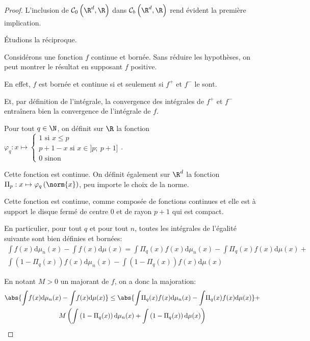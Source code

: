 \begin{proof}
L'inclusion de  $\mathcal{C}_0\left(\R^d,\R\right)$ dans $\mathcal{C}_b\left(\R^d,\R\right)$ rend évident la première implication.

Étudions la réciproque.

Considérons une fonction $f$ continue et bornée. Sans réduire les hypothèses, on peut montrer le résultat en supposant $f$ positive. 

En effet, $f$ est bornée et continue si et seulement si $f^{+}$ et $f^{-}$ le sont.

Et, par définition de l'intégrale, la convergence des intégrales de $f^{+}$ et $f^{-}$ entraînera bien la convergence de l'intégrale de $f$.

Pour tout $q \in \N$, on définit sur $\R$ la fonction $\varphi_q: x \mapsto \begin{cases} 1 \text{ si $x \leq p$}\\ p+1-x \text{ si $x \in ]p;~p+1]$}\\0 \text{ sinon} \end{cases}$.

Cette fonction est continue. On définit également sur $\R^d$ la fonction $\Pi_p: x \mapsto \varphi_q\left(\norm{x}\right)$, peu importe le choix de la norme.

Cette fonction est continue, comme composée de fonctions continues et elle est à support le disque fermé de centre $0$ et de rayon $p+1$ qui est compact. 

En particulier, pour tout $q$ et pour tout $n$, toutes les intégrales de l'égalité suivante sont bien définies et bornées:
\begin{multline*}
\displaystyle{\int} f(x) \mathrm d \mu_n(x) - \displaystyle{\int} f(x) \mathrm d \mu(x) = \displaystyle{\int} \Pi_q(x)f(x) \mathrm d \mu_n(x) - \displaystyle{\int} \Pi_q(x)f(x) \mathrm d \mu(x) + \\
\displaystyle{\int} \left(1-\Pi_q(x)\right)f(x) \mathrm d \mu_n(x) - \displaystyle{\int} \left(1-\Pi_q(x)\right)f(x) \mathrm d \mu(x)
\end{multline*}

En notant $M>0$ un majorant de $f$, on a donc la majoration:
\begin{multline*}
\abs{\displaystyle{\int} f(x) \mathrm d \mu_n(x) - \displaystyle{\int} f(x) \mathrm d \mu(x)} \leq \abs{\displaystyle{\int} \Pi_q(x)f(x) \mathrm d \mu_n(x) - \displaystyle{\int} \Pi_q(x)f(x) \mathrm d \mu(x)} + \\
M \left(\displaystyle{\int} \left(1-\Pi_q(x)\right) \mathrm d \mu_n(x) + \displaystyle{\int} \left(1-\Pi_q(x)\right)\mathrm d \mu(x)\right)
\end{multline*}


\end{proof}
